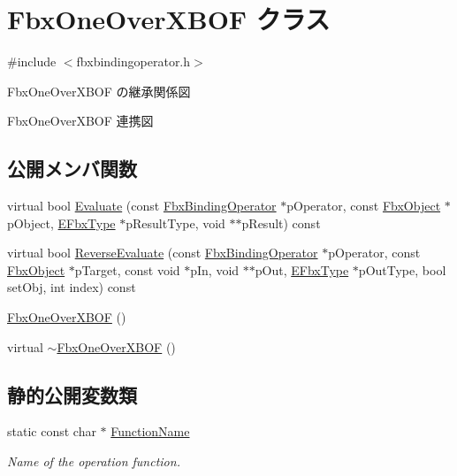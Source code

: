 \hypertarget{class_fbx_one_over_x_b_o_f}{}\section{Fbx\+One\+Over\+X\+B\+OF クラス}
\label{class_fbx_one_over_x_b_o_f}


{\ttfamily \#include $<$fbxbindingoperator.\+h$>$}



Fbx\+One\+Over\+X\+B\+OF の継承関係図


Fbx\+One\+Over\+X\+B\+OF 連携図
\subsection*{公開メンバ関数}
\begin{DoxyCompactItemize}
\item 
virtual bool \hyperlink{class_fbx_one_over_x_b_o_f_a373df11d5ad550e76e2edc28f4182f92}{Evaluate} (const \hyperlink{class_fbx_binding_operator}{Fbx\+Binding\+Operator} $\ast$p\+Operator, const \hyperlink{class_fbx_object}{Fbx\+Object} $\ast$p\+Object, \hyperlink{fbxpropertytypes_8h_a73913a5ddfb20e57c6f25e9e6784bd92}{E\+Fbx\+Type} $\ast$p\+Result\+Type, void $\ast$$\ast$p\+Result) const
\item 
virtual bool \hyperlink{class_fbx_one_over_x_b_o_f_afa8f32a5706dd4cfee3f69547fdeebe4}{Reverse\+Evaluate} (const \hyperlink{class_fbx_binding_operator}{Fbx\+Binding\+Operator} $\ast$p\+Operator, const \hyperlink{class_fbx_object}{Fbx\+Object} $\ast$p\+Target, const void $\ast$p\+In, void $\ast$$\ast$p\+Out, \hyperlink{fbxpropertytypes_8h_a73913a5ddfb20e57c6f25e9e6784bd92}{E\+Fbx\+Type} $\ast$p\+Out\+Type, bool set\+Obj, int index) const
\item 
\hyperlink{class_fbx_one_over_x_b_o_f_a597f7c1e603906da75e10dc844744834}{Fbx\+One\+Over\+X\+B\+OF} ()
\item 
virtual \hyperlink{class_fbx_one_over_x_b_o_f_a0e5a38d0274da6566a972b50099e8523}{$\sim$\+Fbx\+One\+Over\+X\+B\+OF} ()
\end{DoxyCompactItemize}
\subsection*{静的公開変数類}
\begin{DoxyCompactItemize}
\item 
static const char $\ast$ \hyperlink{class_fbx_one_over_x_b_o_f_a17b7276cdb45a9c396edc78b33a6a9c7}{Function\+Name}
\begin{DoxyCompactList}\small\item\em Name of the operation function. \end{DoxyCompactList}\end{DoxyCompactItemize}


